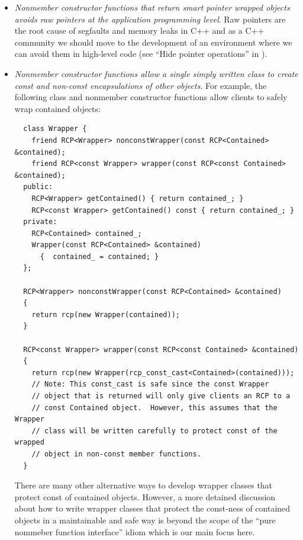 \documentclass[pdf,ps2pdf,11pt]{SANDreport}
\begin{document}
\begin{itemize}

{}\item\textit{Nonmember constructor functions that return smart pointer
wrapped objects avoids raw pointers at the application programming level}.
Raw pointers are the root cause of segfaults and memory leaks in C++ and as a
C++ community we should move to the development of an environment where we can
avoid them in high-level code (see ``Hide pointer operations'' in
{}\cite[Section 7.1]{CodeComplete2nd04}).

{}\item\textit{Nonmember constructor functions allow a single simply written
class to create const and non-const encapsulations of other objects}.  For
example, the following class and nonmember constructor functions allow clients
to safely wrap contained objects:

{\small\begin{verbatim}
  class Wrapper {
    friend RCP<Wrapper> nonconstWrapper(const RCP<Contained> &contained);
    friend RCP<const Wrapper> wrapper(const RCP<const Contained> &contained);
  public:
    RCP<Wrapper> getContained() { return contained_; }
    RCP<const Wrapper> getContained() const { return contained_; }
  private:
    RCP<Contained> contained_;
    Wrapper(const RCP<Contained> &contained)
      {  contained_ = contained; }
  };

  RCP<Wrapper> nonconstWrapper(const RCP<Contained> &contained)
  {
    return rcp(new Wrapper(contained));
  }

  RCP<const Wrapper> wrapper(const RCP<const Contained> &contained)
  {
    return rcp(new Wrapper(rcp_const_cast<Contained>(contained)));
    // Note: This const_cast is safe since the const Wrapper
    // object that is returned will only give clients an RCP to a
    // const Contained object.  However, this assumes that the Wrapper
    // class will be written carefully to protect const of the wrapped
    // object in non-const member functions.
  }

\end{verbatim}}

There are many other alternative ways to develop wrapper classes that protect
const of contained objects.  However, a more detained discussion about how to
write wrapper classes that protect the const-ness of contained objects in a
maintainable and safe way is beyond the scope of the ``pure nommeber function
interface'' idiom which is our main focus here.

\end{itemize}
\end{document}
